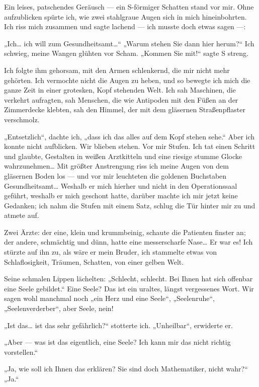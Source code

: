 Ein leises, patschendes Geräusch — ein S-förmiger Schatten stand
vor mir. Ohne aufzublicken spürte ich, wie zwei stahlgraue Augen
sich in mich hineinbohrten. Ich riss mich zusammen und sagte
lachend — ich musste doch etwas sagen —:

„Ich\ldots{} ich will zum Gesundheitsamt\ldots{}“ „Warum stehen Sie dann hier
herum?“ Ich schwieg, meine Wangen glühten vor Scham. „Kommen Sie
mit!“ sagte S streng.

Ich folgte ihm gehorsam, mit den Armen schlenkernd, die mir nicht
mehr gehörten. Ich vermochte nicht die Augen zu heben, und so
bewegte ich mich die ganze Zeit
in einer grotesken, Kopf stehenden Welt. Ich sah Maschinen, die
verkehrt aufragten, sah Menschen, die wie Antipoden mit den Füßen
an der Zimmerdecke klebten, sah den Himmel, der mit dem gläsernen
Straßenpflaster verschmolz.

„Entsetzlich“, dachte ich, „dass ich das alles auf dem Kopf stehen
sehe.“ Aber ich konnte nicht aufblicken. Wir blieben stehen. Vor
mir Stufen. Ich tat einen Schritt und glaubte, Gestalten in weißen
Arztkitteln und eine riesige stumme Glocke wahrzunehmen\ldots{} Mit
größter Anstrengung riss ich meine Augen von dem gläsernen Boden
los — und vor mir leuchteten die goldenen Buchstaben
Gesundheitsamt\ldots{} Weshalb er mich hierher und nicht in den
Operationssaal geführt, weshalb er mich geschont hatte, darüber
machte ich mir jetzt keine Gedanken; ich nahm die Stufen mit einem
Satz, schlug die Tür hinter mir zu und atmete auf.

Zwei Ärzte: der eine, klein und krummbeinig, schaute die Patienten
finster an; der andere, schmächtig und dünn, hatte eine
messerscharfe Nase\ldots{} Er war es! Ich stürzte auf ihn zu, als wäre
er mein Bruder, ich stammelte etwas von Schlaflosigkeit, Träumen,
Schatten, von einer gelben Welt.

Seine schmalen Lippen lächelten: „Schlecht, schlecht. Bei Ihnen hat
sich offenbar eine Seele gebildet.“ Eine Seele? Das ist ein
uraltes, längst vergessenes Wort. Wir sagen wohl manchmal noch „ein
Herz und eine Seele“, „Seelenruhe“, „Seelenverderber“, aber Seele,
nein!

„Ist das\ldots{} ist das sehr gefährlich?“ stotterte ich. „Unheilbar“,
erwiderte er.

„Aber — was ist das eigentlich, eine Seele? Ich kann mir das nicht
richtig vorstellen.“

„Ja, wie soll ich Ihnen das erklären? Sie sind doch Mathematiker,
nicht wahr?“ „Ja.“

